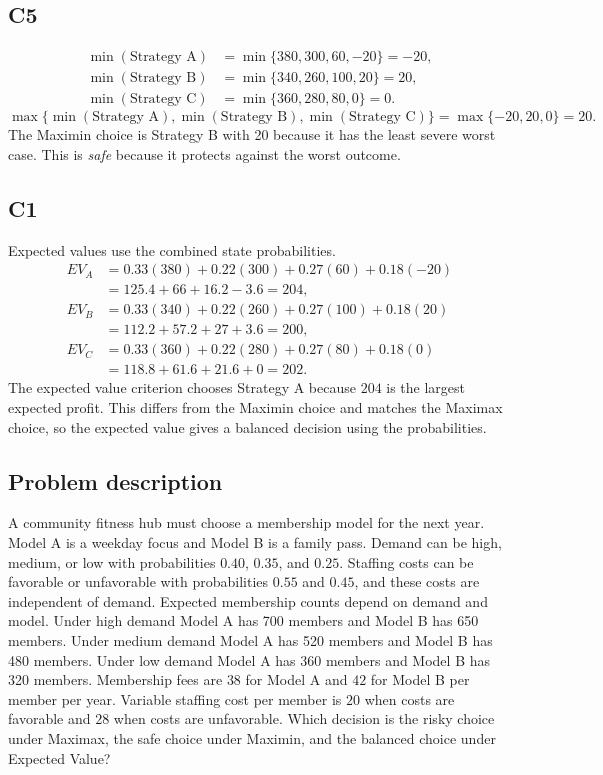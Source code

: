 \begin{ExamProblems}
		\subsection*{C5}
		\[
		\begin{aligned}
		\min(\text{Strategy A}) &= \min\{380,300,60,-20\} = -20,\\
		\min(\text{Strategy B}) &= \min\{340,260,100,20\} = 20,\\
		\min(\text{Strategy C}) &= \min\{360,280,80,0\} = 0.
		\end{aligned}
		\]
		\[
		\max\{\min(\text{Strategy A}), \min(\text{Strategy B}), \min(\text{Strategy C})\}
		= \max\{-20, 20, 0\}
		= 20.
		\]
		The Maximin choice is Strategy B with 20 because it has the least severe worst case. This is \emph{safe} because it protects against the worst outcome.

		\subsection*{C1}
		Expected values use the combined state probabilities.
		\[
		\begin{aligned}
		EV_A &= 0.33(380)+0.22(300)+0.27(60)+0.18(-20)\\
		&= 125.4+66+16.2-3.6=204,\\
		EV_B &= 0.33(340)+0.22(260)+0.27(100)+0.18(20)\\
		&= 112.2+57.2+27+3.6=200,\\
		EV_C &= 0.33(360)+0.22(280)+0.27(80)+0.18(0)\\
		&= 118.8+61.6+21.6+0=202.
		\end{aligned}
		\]
		The expected value criterion chooses Strategy A because $204$ is the largest expected profit. This differs from the Maximin choice and matches the Maximax choice, so the expected value gives a balanced decision using the probabilities.

		\item
		\subsection*{Problem description}
		A community fitness hub must choose a membership model for the next year. Model A is a weekday focus and Model B is a family pass. Demand can be high, medium, or low with probabilities $0.40$, $0.35$, and $0.25$. Staffing costs can be favorable or unfavorable with probabilities $0.55$ and $0.45$, and these costs are independent of demand. Expected membership counts depend on demand and model. Under high demand Model A has 700 members and Model B has 650 members. Under medium demand Model A has 520 members and Model B has 480 members. Under low demand Model A has 360 members and Model B has 320 members. Membership fees are $38$ for Model A and $42$ for Model B per member per year. Variable staffing cost per member is $20$ when costs are favorable and $28$ when costs are unfavorable. Which decision is the risky choice under Maximax, the safe choice under Maximin, and the balanced choice under Expected Value?


\end{ExamProblems}
